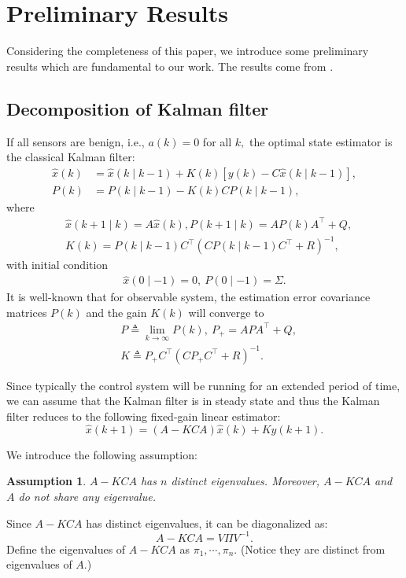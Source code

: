 \documentclass[journal]{IEEEtran}
\newtheorem{assumption}{\textbf{Assumption}}
\begin{document}
	
	\section{Preliminary Results}\label{sec:preli}
	Considering the completeness of this paper, we introduce some preliminary results which are fundamental to our work. The results come from \cite{liuxinghua-IFAC}.
	\subsection{Decomposition of Kalman filter}
	If all sensors are benign, i.e., $a(k)=0$ for all $k,$ the optimal state estimator is the classical Kalman filter:
	\begin{align*}
		\hat{x}(k)&=\hat{x}(k\mid k-1)+K(k)[y(k)-C \hat{x}(k \mid k-1)] ,\\
		P(k)&=P(k \mid k-1)-K(k) C P(k \mid k-1),
	\end{align*}
	where
	\begin{align*}
		&\hat{x}(k+1 \mid k)=A \hat{x}(k), P(k+1 \mid k)=A P(k) A^{\top}+Q ,\\	
		&K(k)=P(k \mid k-1) C^{\top}\left(C P(k \mid k-1) C^{\top}+R\right)^{-1},
	\end{align*}
	with initial condition
	\begin{align*}
		\hat{x}(0 \mid-1)=0,\ P(0 \mid-1)=\Sigma .
	\end{align*}
	It is well-known that for observable system, the estimation error covariance matrices $P(k)$ and the gain $K(k)$ will converge to
	\begin{align*}
		&P \triangleq \lim _{k \rightarrow \infty} P(k),\ P_{+}=A P A^{\top}+Q ,\\
		&K \triangleq P_{+} C^{\top}\left(C P_{+} C^{\top}+R\right)^{-1}.
	\end{align*}
	
	Since typically the control system will be running for an extended period of time, we can assume that the Kalman filter is in steady state and thus the Kalman filter reduces to the following fixed-gain linear estimator:
	\begin{equation}\label{eq:fix_gain_kalman}
		\hat{x}(k+1)=(A-K C A) \hat{x}(k)+K y(k+1) .
	\end{equation}
	
	We introduce the following assumption:
	\begin{assumption}\label{as:distinct_eigvalue}
		$A-K C A$ has $n$ distinct eigenvalues. Moreover, $A-K C A$ and $A$ do not share any eigenvalue.
	\end{assumption}
	Since $A-K C A$ has distinct eigenvalues, it can be diagonalized as:
	\begin{equation}\label{eq:VLambda}
		A-K C A=V \Pi V^{-1}.
	\end{equation}
	Define the eigenvalues of $A-KCA$ as $\pi_{1},\cdots,\pi_{n}$. (Notice they are distinct from eigenvalues of $A$.)
	
\end{document}
